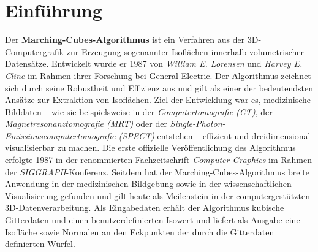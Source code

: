\documentclass[12pt]{article}
\begin{document}
\section{Einführung}
Der \textbf{Marching-Cubes-Algorithmus} ist ein Verfahren aus der 3D-Computergrafik zur Erzeugung sogenannter Isoflächen innerhalb volumetrischer Datensätze.
Entwickelt wurde er 1987 von \textit{William E. Lorensen} und \textit{Harvey E. Cline} im Rahmen ihrer Forschung bei General Electric.
Der Algorithmus zeichnet sich durch seine Robustheit und Effizienz aus und gilt als einer der bedeutendsten Ansätze zur Extraktion von Isoflächen.
Ziel der Entwicklung war es, medizinische Bilddaten – wie sie beispielsweise in der \textit{Computertomografie (CT)},
der \textit{Magnetresonanztomografie (MRT)} oder der \textit{Single-Photon-Emissionscomputertomografie (SPECT)} entstehen – effizient und dreidimensional visualisierbar zu machen.
Die erste offizielle Veröffentlichung des Algorithmus erfolgte 1987 in der renommierten Fachzeitschrift \textit{Computer Graphics} im Rahmen der \textit{SIGGRAPH}-Konferenz.
Seitdem hat der Marching-Cubes-Algorithmus breite Anwendung in der medizinischen Bildgebung sowie in der wissenschaftlichen Visualisierung gefunden
und gilt heute als Meilenstein in der computergestützten 3D-Datenverarbeitung.
Als Eingabedaten erhält der Algorithmus kubische Gitterdaten und einen benutzerdefinierten Isowert
und liefert als Ausgabe eine Isofläche sowie Normalen an den Eckpunkten der durch die Gitterdaten definierten Würfel. \\
\end{document}
